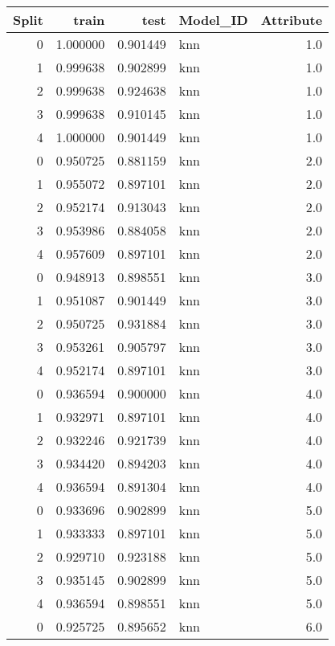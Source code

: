 \begin{tabular}{rrrlr}
\toprule
 Split &    train &     test & Model\_ID &  Attribute \\
\midrule
     0 & 1.000000 & 0.901449 &      knn &        1.0 \\
     1 & 0.999638 & 0.902899 &      knn &        1.0 \\
     2 & 0.999638 & 0.924638 &      knn &        1.0 \\
     3 & 0.999638 & 0.910145 &      knn &        1.0 \\
     4 & 1.000000 & 0.901449 &      knn &        1.0 \\
     0 & 0.950725 & 0.881159 &      knn &        2.0 \\
     1 & 0.955072 & 0.897101 &      knn &        2.0 \\
     2 & 0.952174 & 0.913043 &      knn &        2.0 \\
     3 & 0.953986 & 0.884058 &      knn &        2.0 \\
     4 & 0.957609 & 0.897101 &      knn &        2.0 \\
     0 & 0.948913 & 0.898551 &      knn &        3.0 \\
     1 & 0.951087 & 0.901449 &      knn &        3.0 \\
     2 & 0.950725 & 0.931884 &      knn &        3.0 \\
     3 & 0.953261 & 0.905797 &      knn &        3.0 \\
     4 & 0.952174 & 0.897101 &      knn &        3.0 \\
     0 & 0.936594 & 0.900000 &      knn &        4.0 \\
     1 & 0.932971 & 0.897101 &      knn &        4.0 \\
     2 & 0.932246 & 0.921739 &      knn &        4.0 \\
     3 & 0.934420 & 0.894203 &      knn &        4.0 \\
     4 & 0.936594 & 0.891304 &      knn &        4.0 \\
     0 & 0.933696 & 0.902899 &      knn &        5.0 \\
     1 & 0.933333 & 0.897101 &      knn &        5.0 \\
     2 & 0.929710 & 0.923188 &      knn &        5.0 \\
     3 & 0.935145 & 0.902899 &      knn &        5.0 \\
     4 & 0.936594 & 0.898551 &      knn &        5.0 \\
     0 & 0.925725 & 0.895652 &      knn &        6.0 \\

\end{tabular}
